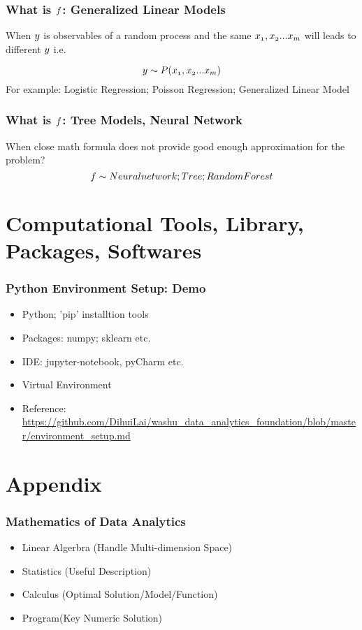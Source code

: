 \documentclass[notheorems, aspectratio=54]{beamer}
\begin{document}
\begin{frame}
\frametitle{What is $\mathnormal{f}$: Generalized Linear Models}
When $\mathnormal{y}$ is observables of a random process and the same $\mathnormal{x_1, x_2 ... x_m}$ will leads to different $\mathnormal{y}$ i.e.

$$\mathnormal{y\sim P(x_1, x_2 ... x_m)}$$
\vspace{0.2cm}
For example: 
Logistic Regression;
Poisson Regression;
Generalized Linear Model
\end{frame}

\begin{frame}
\frametitle{What is $\mathnormal{f}$: Tree Models, Neural Network}
When close math formula does not provide good enough approximation for the problem? \\

$$\mathnormal{f}\sim
Neural network; 
Tree; 
Random Forest
$$ 
\end{frame}


\section{Computational Tools, Library, Packages, Softwares}
\begin{frame}
\frametitle{Python Environment Setup: Demo}
\begin{itemize}
\item Python; 'pip' installtion tools
\item Packages: numpy; sklearn etc.
\item IDE: jupyter-notebook, pyCharm etc.
\item Virtual Environment
\item Reference: \url{https://github.com/DihuiLai/washu_data_analytics_foundation/blob/master/environment_setup.md}

\end{itemize}
\end{frame}


\section{Appendix}
\begin{frame}
\frametitle{Mathematics of Data Analytics}
\begin{itemize}
\item Linear Algerbra (Handle Multi-dimension Space)
\item Statistics (Useful Description)
\item Calculus (Optimal Solution/Model/Function)
\item Program(Key Numeric Solution)
\end{itemize}
\end{frame}
\end{document}
